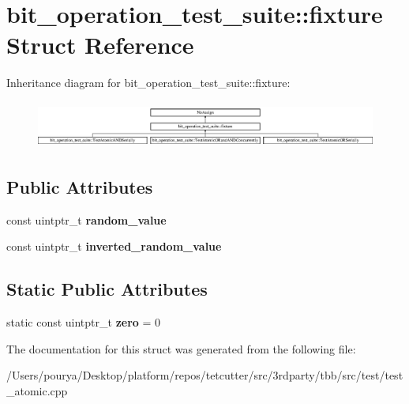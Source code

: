 \hypertarget{structbit__operation__test__suite_1_1fixture}{}\section{bit\+\_\+operation\+\_\+test\+\_\+suite\+:\+:fixture Struct Reference}
\label{structbit__operation__test__suite_1_1fixture}
Inheritance diagram for bit\+\_\+operation\+\_\+test\+\_\+suite\+:\+:fixture\+:\begin{figure}[H]
\begin{center}
\leavevmode
\includegraphics[height=1.559889cm]{structbit__operation__test__suite_1_1fixture}
\end{center}
\end{figure}
\subsection*{Public Attributes}
\begin{DoxyCompactItemize}
\item 
\hypertarget{structbit__operation__test__suite_1_1fixture_adfacadf51a916751c810bd5c51ac5e87}{}const uintptr\+\_\+t {\bfseries random\+\_\+value}\label{structbit__operation__test__suite_1_1fixture_adfacadf51a916751c810bd5c51ac5e87}

\item 
\hypertarget{structbit__operation__test__suite_1_1fixture_a4c407dcc2948821b30d36ca976e7c197}{}const uintptr\+\_\+t {\bfseries inverted\+\_\+random\+\_\+value}\label{structbit__operation__test__suite_1_1fixture_a4c407dcc2948821b30d36ca976e7c197}

\end{DoxyCompactItemize}
\subsection*{Static Public Attributes}
\begin{DoxyCompactItemize}
\item 
\hypertarget{structbit__operation__test__suite_1_1fixture_ab65c0477f8638d359745342668c1d295}{}static const uintptr\+\_\+t {\bfseries zero} = 0\label{structbit__operation__test__suite_1_1fixture_ab65c0477f8638d359745342668c1d295}

\end{DoxyCompactItemize}


The documentation for this struct was generated from the following file\+:\begin{DoxyCompactItemize}
\item 
/\+Users/pourya/\+Desktop/platform/repos/tetcutter/src/3rdparty/tbb/src/test/test\+\_\+atomic.\+cpp\end{DoxyCompactItemize}
